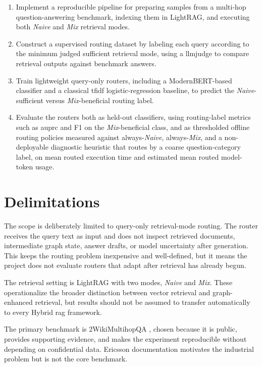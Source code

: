 \documentclass[english, bibtex]{kththesis}               %
\numberwithin{listing}{chapter}
\begin{document}
\begin{enumerate}
\item Implement a reproducible pipeline for preparing samples from a multi-hop question-answering benchmark, indexing them in LightRAG, and executing both \emph{Naive} and \emph{Mix} retrieval modes.
\item Construct a supervised routing dataset by labeling each query according to the minimum judged sufficient retrieval mode, using a \gls{llmjudge} to compare retrieval outputs against benchmark answers.
\item Train lightweight query-only routers, including a ModernBERT-based classifier and a classical \gls{tfidf} logistic-regression baseline, to predict the \emph{Naive}-sufficient versus \emph{Mix}-beneficial routing label.
\item Evaluate the routers both as held-out classifiers, using routing-label metrics such as \gls{auprc} and F1 on the \emph{Mix}-beneficial class, and as thresholded offline routing policies measured against always-\emph{Naive}, always-\emph{Mix}, and a non-deployable diagnostic heuristic that routes by a coarse question-category label, on mean routed execution time and estimated mean routed model-token usage.
\end{enumerate}

\section{Delimitations}
\label{sec:delimitations}

The scope is deliberately limited to query-only retrieval-mode routing. The router receives the query text as input and does not inspect retrieved documents, intermediate graph state, answer drafts, or model uncertainty after generation. This keeps the routing problem inexpensive and well-defined, but it means the project does not evaluate routers that adapt after retrieval has already begun.

The retrieval setting is LightRAG with two modes, \emph{Naive} and \emph{Mix}. These operationalize the broader distinction between vector retrieval and graph-enhanced retrieval, but results should not be assumed to transfer automatically to every Hybrid \gls{rag} framework.

The primary benchmark is 2WikiMultihopQA \cite{ho2020twowiki}, chosen because it is public, provides supporting evidence, and makes the experiment reproducible without depending on confidential data. Ericsson documentation motivates the industrial problem but is not the core benchmark.
\end{document}
